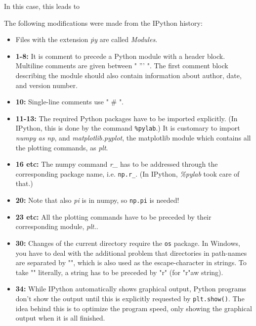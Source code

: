 In this case, this leads to



The following modifications were made from the IPython history:

\begin{itemize}
  \item Files with the extension \emph{\.py} are called \emph{Modules}.
  \item \textbf{1-8:} It is comment to precede a Python module with a header block. Multiline comments are given between " ''' ". The first comment block describing the module should also contain information about author, date, and version number.
  \item \textbf{10:}  Single-line comments use " \# ".
  \item \textbf{11-13:} The required Python packages have to be imported explicitly. (In IPython, this is done by the command \lstinline{%pylab}.) It is customary to import \emph{numpy as np}, and \emph{matplotlib.pyplot}, the matplotlib module which contains all the plotting commands, as \emph{plt}.

  \item \textbf{16 etc:} The numpy command \emph{r\_} has to be addressed through the corresponding package name, i.e. \lstinline{np.r_}. (In IPython, \emph{\%pylab} took care of that.)
  \item \textbf{20:}  Note that also \emph{pi} is in numpy, so \lstinline{np.pi} is needed!
 \item \textbf{23 etc:}  All the plotting commands have to be preceded by their corresponding module, \emph{plt.}.
  \item \textbf{30:} Changes of the current directory require the \lstinline{os} package. In Windows, you have to deal with the additional problem that directories in path-names are separated by "", which is also used as the escape-character in strings. To take "" literally, a string has to be preceded by "r" (for "r"aw string).
  \item \textbf{34:} While IPython automatically shows graphical output, Python programs don't show the output until this is explicitly requested by \lstinline{plt.show()}. The idea behind this is to optimize the program speed, only showing the graphical output when it is all finished.
\end{itemize}

